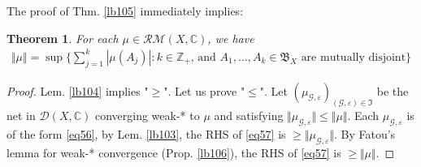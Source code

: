 \documentclass[12pt,b5paper,notitlepage]{article}
\theoremstyle{definition}
\theoremstyle{plain}
\newtheorem{thm}[df]{Theorem}
\newcommand{\fk}{\mathfrak}
\newcommand{\Cbb}{\mathbb C}
\newcommand{\Zbb}{\mathbb Z}
\newcommand{\Rbb}{\mathbb R}
\newcommand{\eps}{\varepsilon}
\newcommand{\MG}{\mathcal G}
\newcommand{\MD}{\mathcal D}
\newcommand{\RM}{\mathcal {RM}}
\numberwithin{equation}{section}
\begin{document}
The proof of Thm. \ref{lb105} immediately implies:


\begin{thm}
For each $\mu\in\RM(X,\Cbb)$, we have
\begin{align}\label{eq57}
\Vert\mu\Vert=\sup\Big\{\sum_{j=1}^k|\mu(A_j)|:k\in\Zbb_+\text{, and $A_1,\dots,A_k\in\fk B_X$ are mutually disjoint}\Big\}
\end{align}
\end{thm}

\begin{proof}
Lem. \ref{lb104} implies "$\geq$". Let us prove "$\leq$". Let $(\mu_{\MG,\eps})_{(\MG,\eps)\in\fk I}$ be the net in $\MD(X,\Cbb)$ converging weak-* to $\mu$ and satisfying $\Vert\mu_{\MG,\eps}\Vert\leq\Vert\mu\Vert$. Each $\mu_{\MG,\eps}$ is of the form \eqref{eq56}, by Lem. \ref{lb103}, the RHS of \eqref{eq57} is $\geq\Vert\mu_{\MG,\eps}\Vert$. By Fatou's lemma for weak-* convergence (Prop. \ref{lb106}), the RHS of \eqref{eq57} is $\geq\Vert\mu\Vert$.
\end{proof}


\begin{comment}
In Subsec. \ref{lb107}, we noted that characterizing the dual space $V^*$ is equivalent to establishing the equivalence between the first and second columns of Table \ref{tb1}---that is, between pointwise convergence of functions and convergence of moments---once Principle \ref{lb23} is in place.

Now, let $I\subset\Rbb$ be a proper interval, and suppose our goal is to classify the positive linear functionals on $C(I)$, i.e., to prove the Riesz Representation Thm. \ref{lb9}. The equivalence of the first and second columns of Table \ref{tb1} is established in Thm. \ref{lb92} and Cor. \ref{lb95}. If we can prove Principle \ref{lb23}, which asserts in the current setting that any positive linear functional on $C(I)$ can be weak-* approximated by elementary functions (i.e., linear combinations of Dirac measures; see Table \ref{lb3}), then Thm. \ref{lb9} follows as a consequence.

Of course, Thm. \ref{lb105} shows that Principle \ref{lb23} can be deduced if the Riesz Representation Thm. \ref{lb9} is already known. However, by slightly modifying the argument in the proof of Thm. \ref{lb105}, one can prove Principle \ref{lb23} without assuming Thm. \ref{lb9} in advance:
\end{comment}


\newpage
\end{document}
